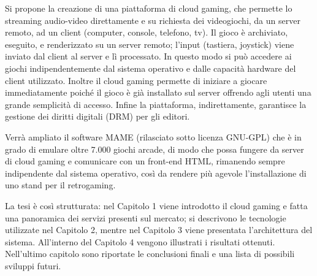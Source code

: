 Si propone la creazione di una piattaforma di cloud gaming, che permette lo streaming audio-video direttamente e su richiesta dei videogiochi, da un server remoto, ad un client (computer, console, telefono, tv). Il gioco è archiviato, eseguito, e renderizzato su un server remoto; l'input (tastiera, joystick) viene inviato dal client al server e lì processato. In questo modo si può accedere ai giochi indipendentemente dal sistema operativo e dalle capacità hardware del client utilizzato. Inoltre il cloud gaming permette di iniziare a giocare immediatamente poiché il gioco è già installato sul server offrendo agli utenti una grande semplicità di accesso. Infine la piattaforma, indirettamente, garantisce la gestione dei diritti digitali (DRM) per gli editori.

Verrà ampliato il software MAME (rilasciato sotto licenza GNU-GPL) che è in grado di emulare oltre 7.000 giochi arcade, di modo che possa fungere da server di cloud gaming e comunicare con un front-end HTML, rimanendo sempre indipendente dal sistema operativo, così da rendere più agevole l’installazione di uno stand per il retrogaming.

La tesi è così strutturata: nel Capitolo 1 viene introdotto il cloud gaming e fatta una panoramica dei servizi presenti sul mercato; si descrivono le tecnologie utilizzate nel Capitolo 2, mentre nel Capitolo 3 viene presentata l'architettura del sistema. All’interno del Capitolo 4 vengono illustrati i risultati ottenuti. Nell'ultimo capitolo sono riportate le conclusioni finali e una lista di possibili sviluppi futuri.